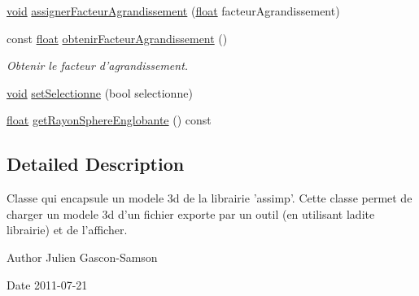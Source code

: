 \begin{DoxyCompactItemize}
\item 
\hyperlink{wglew_8h_aeea6e3dfae3acf232096f57d2d57f084}{void} \hyperlink{group__inf2990_gae1ac7bcdbc6bbb75ae9b26edb3e06e4d}{assigner\-Facteur\-Agrandissement} (\hyperlink{fmod_8h_aeb841aa4b4b5f444b5d739d865b420af}{float} facteur\-Agrandissement)
\item 
const \hyperlink{fmod_8h_aeb841aa4b4b5f444b5d739d865b420af}{float} \hyperlink{group__inf2990_gac6181a36077d672f673879a7ddea628a}{obtenir\-Facteur\-Agrandissement} ()
\begin{DoxyCompactList}\small\item\em Obtenir le facteur d'agrandissement. \end{DoxyCompactList}\item 
\hyperlink{wglew_8h_aeea6e3dfae3acf232096f57d2d57f084}{void} \hyperlink{class_modele3_d_aa7178546dff87e72d7c30300b9c4d2b9}{set\-Selectionne} (bool selectionne)
\item 
\hyperlink{fmod_8h_aeb841aa4b4b5f444b5d739d865b420af}{float} \hyperlink{class_modele3_d_ad00cb228449b856507c55ca20a6b5b48}{get\-Rayon\-Sphere\-Englobante} () const 
\end{DoxyCompactItemize}


\subsection{Detailed Description}
Classe qui encapsule un modele 3d de la librairie 'assimp'. Cette classe permet de charger un modele 3d d'un fichier exporte par un outil (en utilisant ladite librairie) et de l'afficher. 

\begin{DoxyAuthor}{Author}
Julien Gascon-\/\-Samson 
\end{DoxyAuthor}
\begin{DoxyDate}{Date}
2011-\/07-\/21 
\end{DoxyDate}


